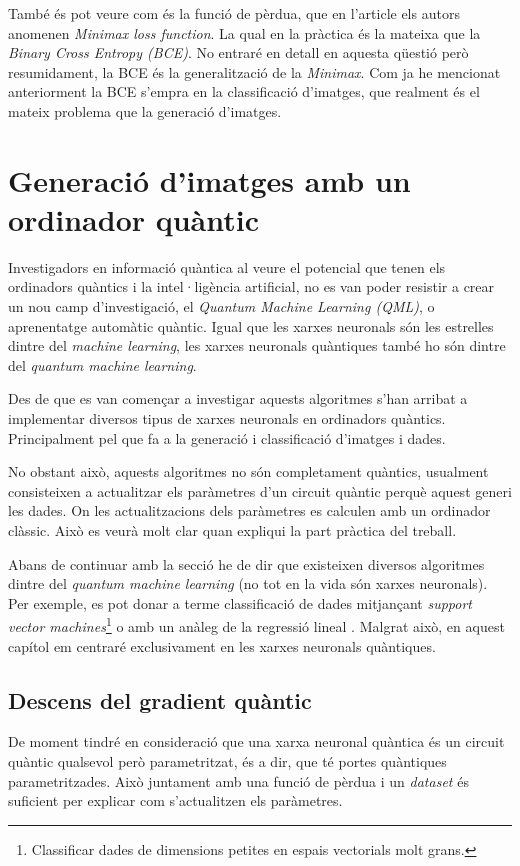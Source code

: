 També és pot veure com és la funció de pèrdua, que en l'article els autors anomenen \textit{Minimax loss function}. La qual en la pràctica és la mateixa que la \textit{Binary Cross Entropy (BCE)}. No entraré en detall en aquesta qüestió però resumidament, la BCE és la generalització de la \textit{Minimax}. Com ja he mencionat anteriorment la BCE s'empra en la classificació d'imatges, que realment és el mateix problema que la generació d'imatges.



\chapter{Generació d'imatges amb un ordinador quàntic}

Investigadors en informació quàntica al veure el potencial que tenen els ordinadors quàntics i la intel·ligència artificial, no es van poder resistir a crear un nou camp d'investigació, el \textit{Quantum Machine Learning (QML)}, o aprenentatge automàtic quàntic. Igual que les xarxes neuronals són les estrelles dintre del \textit{machine learning}, les xarxes neuronals quàntiques també ho són dintre del \textit{quantum machine learning}.

Des de que es van començar a investigar aquests algoritmes s'han arribat a implementar diversos tipus de xarxes neuronals en ordinadors quàntics. Principalment pel que fa a la generació i classificació d'imatges i dades.

No obstant això, aquests algoritmes no són completament quàntics, usualment consisteixen a actualitzar els paràmetres d'un circuit quàntic perquè aquest generi les dades. On les actualitzacions dels paràmetres es calculen amb un ordinador clàssic. Això es veurà molt clar quan expliqui la part pràctica del treball.

Abans de continuar amb la secció he de dir que existeixen diversos algoritmes dintre del \textit{quantum machine learning} (no tot en la vida són xarxes neuronals). Per exemple, es pot donar a terme classificació de dades mitjançant \textit{support vector machines}\footnote{Classificar dades de dimensions petites en espais vectorials molt grans.} \cite{QSVM_2019, QSVM_xanadu_2019} o amb un anàleg de la regressió lineal \cite{Q_linear_regression_xanadu}. Malgrat això, en aquest capítol em centraré exclusivament en les xarxes neuronals quàntiques.

\section{Descens del gradient quàntic}
De moment tindré en consideració que una xarxa neuronal quàntica és un circuit quàntic qualsevol però parametritzat, és a dir, que té portes quàntiques parametritzades. Això juntament amb una funció de pèrdua i un \textit{dataset} és suficient per explicar com s'actualitzen els paràmetres.

